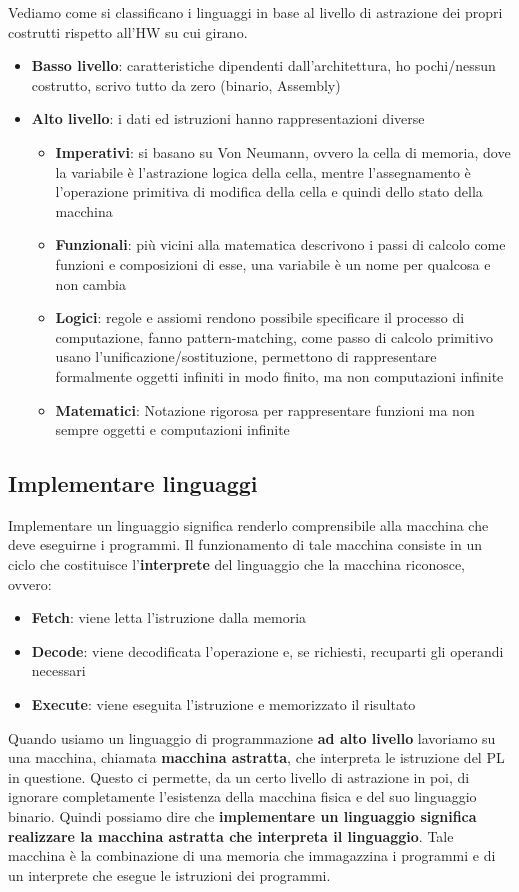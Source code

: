 \documentclass[12pt,a4paper]{article}
\begin{document}
Vediamo come si classificano i linguaggi in base al livello di astrazione dei propri costrutti rispetto all'HW su cui girano.
\begin{itemize}
\item \textbf{Basso livello}: caratteristiche dipendenti dall'architettura, ho pochi\slash nessun costrutto, scrivo tutto da zero (binario, Assembly)
\item \textbf{Alto livello}: i dati ed istruzioni hanno rappresentazioni diverse
\begin{itemize}
\item \textbf{Imperativi}: si basano su Von Neumann, ovvero la cella di memoria, dove la variabile è l'astrazione logica della cella, mentre l'assegnamento è l'operazione primitiva di modifica della cella e quindi dello stato della macchina
\item \textbf{Funzionali}: più vicini alla matematica descrivono i passi di calcolo come funzioni e composizioni di esse, una variabile è un nome per qualcosa e non cambia
\item \textbf{Logici}: regole e assiomi rendono possibile specificare il processo di computazione, fanno pattern-matching, come passo di calcolo primitivo usano l'unificazione\slash sostituzione, permettono di rappresentare formalmente oggetti infiniti in modo finito, ma non computazioni infinite
\item \textbf{Matematici}: Notazione rigorosa per rappresentare funzioni ma non sempre oggetti e computazioni infinite
\end{itemize}
\end{itemize}

\clearpage

\subsection{Implementare linguaggi}
Implementare un linguaggio significa renderlo comprensibile alla macchina che deve eseguirne i programmi.
Il funzionamento di tale macchina consiste in un ciclo che costituisce l'\textbf{interprete} del linguaggio che la macchina riconosce, ovvero:
\begin{itemize}
\item \textbf{Fetch}: viene letta l'istruzione dalla memoria
\item \textbf{Decode}: viene decodificata l'operazione e, se richiesti, recuparti gli operandi necessari
\item \textbf{Execute}: viene eseguita l'istruzione e memorizzato il risultato
\end{itemize}
Quando usiamo un linguaggio di programmazione \textbf{ad alto livello} lavoriamo su una macchina, chiamata \textbf{macchina astratta}, che interpreta le istruzione del PL in questione. Questo ci permette, da un certo livello di astrazione in poi, di ignorare completamente l'esistenza della macchina fisica e del suo linguaggio binario.
Quindi possiamo dire che \textbf{implementare un linguaggio significa realizzare la macchina astratta che interpreta il linguaggio}. Tale macchina è la combinazione di una memoria che immagazzina i programmi e di un interprete che esegue le istruzioni dei programmi.
\end{document}
